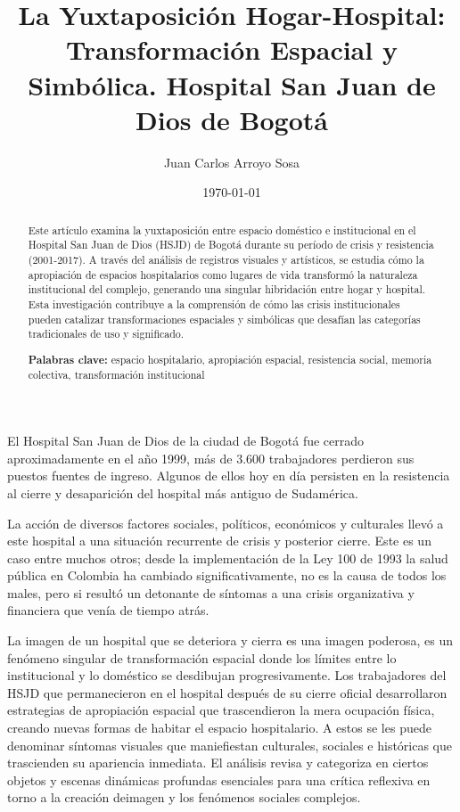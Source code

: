 \documentclass[12pt]{article}
\title{La Yuxtaposición Hogar-Hospital: Transformación Espacial y Simbólica. Hospital San Juan de Dios de Bogotá}
\author{Juan Carlos Arroyo Sosa}
\date{\today}
\begin{document}
\maketitle

\begin{abstract}
Este artículo examina la yuxtaposición entre espacio doméstico e institucional en el Hospital San Juan de Dios (HSJD) de Bogotá durante su período de crisis y resistencia (2001-2017). A través del análisis de registros visuales y artísticos, se estudia cómo la apropiación de espacios hospitalarios como lugares de vida transformó la naturaleza institucional del complejo, generando una singular hibridación entre hogar y hospital. Esta investigación contribuye a la comprensión de cómo las crisis institucionales pueden catalizar transformaciones espaciales y simbólicas que desafían las categorías tradicionales de uso y significado.

\textbf{Palabras clave:} espacio hospitalario, apropiación espacial, resistencia social, memoria colectiva, transformación institucional
\end{abstract}

El Hospital San Juan de Dios de la ciudad de Bogotá fue cerrado aproximadamente en el año 1999, más de 3.600  trabajadores perdieron sus puestos fuentes de ingreso. Algunos de ellos hoy en día persisten en la resistencia al cierre y desaparición del hospital más antiguo de Sudamérica. 

La acción de diversos factores sociales, políticos, económicos y culturales llevó a este hospital a una situación recurrente de crisis y posterior cierre. Este es un caso entre muchos otros; desde la implementación de la Ley 100 de 1993 la salud pública en Colombia ha cambiado significativamente, no es la causa de todos los males, pero si resultó un detonante de síntomas a una crisis organizativa y financiera que venía de tiempo atrás.

La imagen  de un hospital que se deteriora y cierra es una imagen poderosa, es un fenómeno singular de transformación espacial donde los límites entre lo institucional y lo doméstico se desdibujan progresivamente. Los trabajadores del HSJD que permanecieron en el hospital después de su cierre oficial desarrollaron estrategias de apropiación espacial que trascendieron la mera ocupación física, creando nuevas formas de habitar el espacio hospitalario. A estos se les puede denominar síntomas visuales que maniefiestan culturales, sociales e históricas que trascienden su apariencia inmediata. El análisis revisa y categoriza en ciertos objetos y escenas dinámicas profundas esenciales para una crítica reflexiva en torno a la creación deimagen y los fenómenos sociales complejos.
\end{document}
